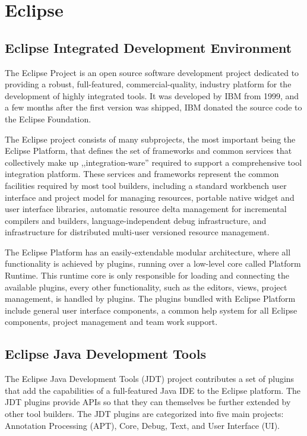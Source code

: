 \section{Eclipse}

\subsection{Eclipse Integrated Development Environment}
The Eclipse Project \cite{Eclipseproject} is an open source software development
project dedicated to providing a robust, full-featured, commercial-quality,
industry platform for the development of highly integrated tools. It was
developed by IBM from 1999, and a few months after the first version was
shipped, IBM donated the source code to the Eclipse Foundation.

The Eclipse project consists of many subprojects, the most important being the
Eclipse Platform, that defines the set of frameworks and common services that
collectively make up ,,integ\-ration-ware'' required to support a comprehensive
tool integration platform. These services and frameworks represent the common
facilities required by most tool builders, including a standard workbench user
interface and project model for managing resources, portable native widget and
user interface libraries, automatic resource delta management for incremental
compilers and builders, language-independent debug infrastructure, and
infrastructure for distributed multi-user versioned resource management.

The Eclipse Platform has an easily-extendable modular architecture, where all
functionality is achieved by plugins, running over a low-level core called
Platform Runtime. This runtime core is only responsible for loading and
connecting the available plugins, every other functionality, such as the
editors, views, project management, is handled by plugins. The plugins bundled
with Eclipse Platform include general user interface components, a common help
system for all Eclipse components, project management and team work support.

\subsection{Eclipse Java Development Tools}
The Eclipse Java Development Tools (JDT) project \cite{JDT} contributes a set of
plugins that add the capabilities of a full-featured Java IDE to the Eclipse
platform. The JDT plugins provide APIs so that they can themselves be further
extended by other tool builders. The JDT plugins are categorized into five main
projects: Annotation Processing (APT), Core, Debug, Text, and User Interface
(UI).

